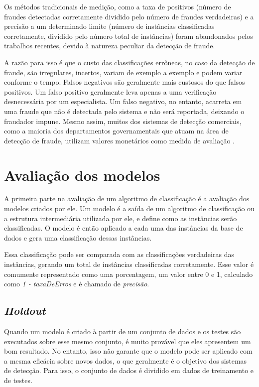 Os métodos tradicionais de medição, como a taxa de positivos (número de fraudes detectadas corretamente dividido pelo número de fraudes verdadeiras) e a precisão a um determinado limite (número de instâncias classificadas corretamente, dividido pelo número total de instâncias) foram abandonados pelos trabalhos recentes, devido à natureza peculiar da detecção de fraude.

A razão para isso é que o custo das classificações errôneas, no caso da detecção de fraude, são irregulares, incertos, variam de exemplo a exemplo e podem variar conforme o tempo. Falsos negativos são geralmente mais custosos do que falsos positivos. Um falso positivo geralmente leva apenas a uma verificação desnecessária por um especialista. Um falso negativo, no entanto, acarreta em uma fraude que não é detectada pelo sistema e não será reportada, deixando o fraudador impune. Mesmo assim, muitos dos sistemas de detecção comerciais, como a maioria dos departamentos governamentais que atuam na área de detecção de fraude, utilizam valores monetários como medida de avaliação \cite{Phua2010}.

\section{Avaliação dos modelos}

A primeira parte na avaliação de um algoritmo de classificação é a avaliação dos modelos criados por ele. Um modelo é a saída de um algoritmo de classificação ou a estrutura intermediária utilizada por ele, e define como as instâncias serão classificadas. O modelo é então aplicado a cada uma das instâncias da base de dados e gera uma classificação dessas instâncias.

Essa classificação pode ser comparada com as classificações verdadeiras das instâncias, gerando um total de instâncias classificadas corretamente. Esse valor é comumente representado como uma porcentagem, um valor entre 0 e 1, calculado como \emph{1 - taxaDeErros} e é chamado de \emph{precisão}.

\subsection{\emph{Holdout}}

Quando um modelo é criado à partir de um conjunto de dados e os testes são executados sobre esse mesmo conjunto, é muito provável que eles apresentem um bom resultado. No entanto, isso não garante que o modelo pode ser aplicado com a mesma eficácia sobre novos dados, o que geralmente é o objetivo dos sistemas de detecção. Para isso, o conjunto de dados é dividido em dados de treinamento e de testes.

